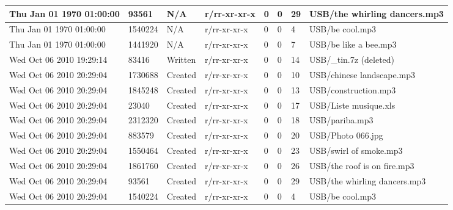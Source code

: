 \begin{longtable}[c]{|p{0.121\DUtablewidth}|p{0.1\DUtablewidth}|p{0.08\DUtablewidth}|p{0.12\DUtablewidth}|p{0.06\DUtablewidth}|p{0.06\DUtablewidth}|p{0.06\DUtablewidth}|p{0.2\DUtablewidth}|}
Thu Jan 01 1970 01:00:00
 & 
93561
 & 
N/A
 & 
r/rr-xr-xr-x
 & 
0
 & 
0
 & 
29
 & 
USB/the whirling dancers.mp3
 \\
\hline

Thu Jan 01 1970 01:00:00
 & 
1540224
 & 
N/A
 & 
r/rr-xr-xr-x
 & 
0
 & 
0
 & 
4
 & 
USB/be cool.mp3
 \\
\hline

Thu Jan 01 1970 01:00:00
 & 
1441920
 & 
N/A
 & 
r/rr-xr-xr-x
 & 
0
 & 
0
 & 
7
 & 
USB/be like a bee.mp3
 \\
\hline

Wed Oct 06 2010 19:29:14
 & 
83416
 & 
Written
 & 
r/rr-xr-xr-x
 & 
0
 & 
0
 & 
14
 & 
USB/\_tin.7z (deleted)
 \\
\hline

Wed Oct 06 2010 20:29:04
 & 
1730688
 & 
Created
 & 
r/rr-xr-xr-x
 & 
0
 & 
0
 & 
10
 & 
USB/chinese landscape.mp3
 \\
\hline

Wed Oct 06 2010 20:29:04
 & 
1845248
 & 
Created
 & 
r/rr-xr-xr-x
 & 
0
 & 
0
 & 
13
 & 
USB/construction.mp3
 \\
\hline

Wed Oct 06 2010 20:29:04
 & 
23040
 & 
Created
 & 
r/rr-xr-xr-x
 & 
0
 & 
0
 & 
17
 & 
USB/Liste musique.xls
 \\
\hline

Wed Oct 06 2010 20:29:04
 & 
2312320
 & 
Created
 & 
r/rr-xr-xr-x
 & 
0
 & 
0
 & 
18
 & 
USB/pariba.mp3
 \\
\hline

Wed Oct 06 2010 20:29:04
 & 
883579
 & 
Created
 & 
r/rr-xr-xr-x
 & 
0
 & 
0
 & 
20
 & 
USB/Photo 066.jpg
 \\
\hline

Wed Oct 06 2010 20:29:04
 & 
1550464
 & 
Created
 & 
r/rr-xr-xr-x
 & 
0
 & 
0
 & 
23
 & 
USB/swirl of smoke.mp3
 \\
\hline

Wed Oct 06 2010 20:29:04
 & 
1861760
 & 
Created
 & 
r/rr-xr-xr-x
 & 
0
 & 
0
 & 
26
 & 
USB/the roof is on fire.mp3
 \\
\hline

Wed Oct 06 2010 20:29:04
 & 
93561
 & 
Created
 & 
r/rr-xr-xr-x
 & 
0
 & 
0
 & 
29
 & 
USB/the whirling dancers.mp3
 \\
\hline

Wed Oct 06 2010 20:29:04
 & 
1540224
 & 
Created
 & 
r/rr-xr-xr-x
 & 
0
 & 
0
 & 
4
 & 
USB/be cool.mp3
 \\
\hline


\end{longtable}
